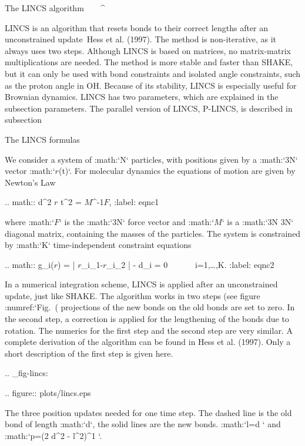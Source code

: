 {The LINCS algorithm
^^^^^^^^^^^^^^^^^^^

LINCS is an algorithm that resets bonds to their correct lengths after
an unconstrained update Hess et al. (1997). The method is non-iterative,
as it always uses two steps. Although LINCS is based on matrices, no
matrix-matrix multiplications are needed. The method is more stable and
faster than SHAKE, but it can only be used with bond constraints and
isolated angle constraints, such as the proton angle in OH. Because of
its stability, LINCS is especially useful for Brownian dynamics. LINCS
has two parameters, which are explained in the subsection parameters.
The parallel version of LINCS, P-LINCS, is described in subsection

The LINCS formulas
^^^^^^^^^^^^^^^^^^

We consider a system of :math:`N` particles, with positions given by a
:math:`3N` vector :math:`{\mbox{\boldmath ${r}$}}(t)`. For molecular
dynamics the equations of motion are given by Newton’s Law

.. math:: {{\mbox{d}}^2 {\mbox{\boldmath ${r}$}} t^2} = {{{\mbox{\boldmath ${M}$}}}^{-1}}{\mbox{\boldmath ${F}$}},
          :label: eqnc1

where :math:`{\mbox{\boldmath ${F}$}}` is the :math:`3N` force vector
and :math:`{{\mbox{\boldmath ${M}$}}}` is a :math:`3N \times 3N`
diagonal matrix, containing the masses of the particles. The system is
constrained by :math:`K` time-independent constraint equations

.. math:: g_i({\mbox{\boldmath ${r}$}}) = | {\mbox{\boldmath ${r}$}}_{i_1}-{\mbox{\boldmath ${r}$}}_{i_2} | - d_i = 0 ~~~~~~i=1,\ldots,K.
          :label: eqnc2

In a numerical integration scheme, LINCS is applied after an
unconstrained update, just like SHAKE. The algorithm works in two steps
(see figure :numref:`Fig. (%
projections of the new bonds on the old bonds are set to zero. In the
second step, a correction is applied for the lengthening of the bonds
due to rotation. The numerics for the first step and the second step are
very similar. A complete derivation of the algorithm can be found in
Hess et al. (1997). Only a short description of the first step is given
here.

.. _fig-lincs:

.. figure:: plots/lincs.eps

   The three position updates needed for one time step. The dashed
   line is the old bond of length :math:`d`, the solid lines are the new
   bonds. :math:`l=d \cos \theta` and :math:`p=(2 d^2 - l^2)^{1 }`.

}
